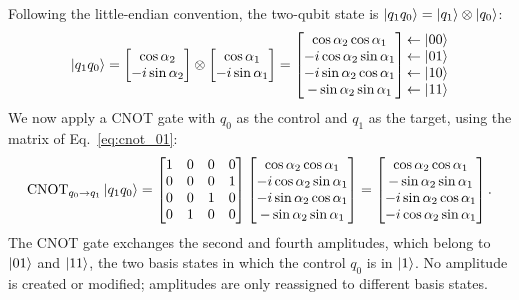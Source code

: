 \documentclass[12pt]{article}
\numberwithin{equation}{section}  %
\begin{document}
Following the little-endian convention, the two-qubit state is $\ket{q_1 q_0} = \ket{q_1} \otimes \ket{q_0}$:
\begin{equation}
\ket{q_1 q_0} =
\begin{bmatrix} \cos\alpha_2 \\ -i\sin\alpha_2 \end{bmatrix} \otimes
\begin{bmatrix} \cos\alpha_1 \\ -i\sin\alpha_1 \end{bmatrix}
=
\begin{bmatrix}
\cos\alpha_2 \cos\alpha_1 \\
-i\cos\alpha_2 \sin\alpha_1 \\
-i\sin\alpha_2 \cos\alpha_1 \\
-\sin\alpha_2 \sin\alpha_1
\end{bmatrix}
\begin{matrix} \leftarrow \ket{00} \\ \leftarrow \ket{01} \\ \leftarrow \ket{10} \\ \leftarrow \ket{11} \end{matrix}
\label{eq:stateof2}
\end{equation}
We now apply a CNOT gate with $q_0$ as the control and $q_1$ as the target, using the matrix of Eq.~\eqref{eq:cnot_01}:
\begin{equation}
\mathrm{CNOT}_{q_0 \to q_1} \ket{q_1 q_0} =
\begin{bmatrix}
1 & 0 & 0 & 0 \\
0 & 0 & 0 & 1 \\
0 & 0 & 1 & 0 \\
0 & 1 & 0 & 0
\end{bmatrix}
\begin{bmatrix}
\cos\alpha_2 \cos\alpha_1 \\
-i\cos\alpha_2 \sin\alpha_1 \\
-i\sin\alpha_2 \cos\alpha_1 \\
-\sin\alpha_2 \sin\alpha_1
\end{bmatrix}
=
\begin{bmatrix}
\cos\alpha_2 \cos\alpha_1 \\
-\sin\alpha_2 \sin\alpha_1 \\
-i\sin\alpha_2 \cos\alpha_1 \\
-i\cos\alpha_2 \sin\alpha_1
\end{bmatrix}.
\label{eq:cnoton2}
\end{equation}
The CNOT gate exchanges the second and fourth amplitudes, which belong to $\ket{01}$ and $\ket{11}$, the two basis states in which the control $q_0$ is in $\ket{1}$. No amplitude is created or modified; amplitudes are only reassigned to different basis states.
\end{document}
